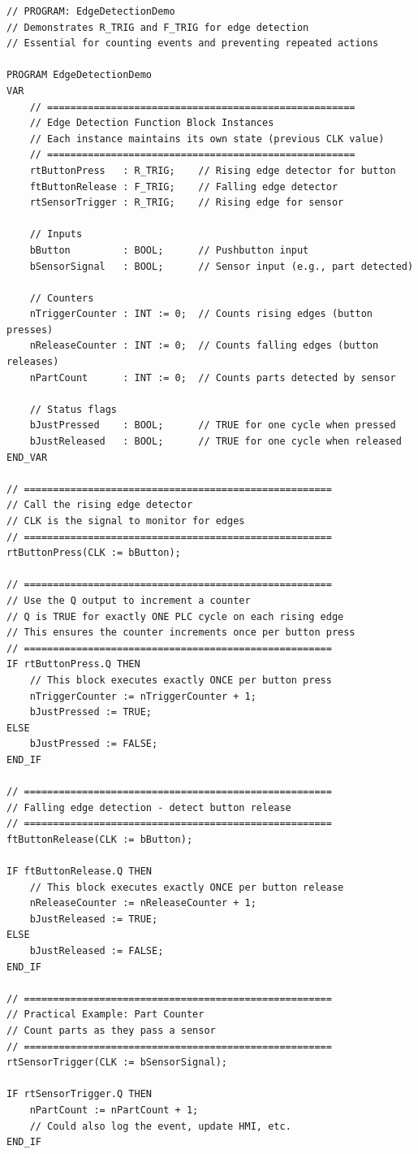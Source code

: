 \documentclass[11pt,a4paper]{article}
\begin{document}
\begin{lstlisting}
// PROGRAM: EdgeDetectionDemo
// Demonstrates R_TRIG and F_TRIG for edge detection
// Essential for counting events and preventing repeated actions

PROGRAM EdgeDetectionDemo
VAR
    // =====================================================
    // Edge Detection Function Block Instances
    // Each instance maintains its own state (previous CLK value)
    // =====================================================
    rtButtonPress   : R_TRIG;    // Rising edge detector for button
    ftButtonRelease : F_TRIG;    // Falling edge detector
    rtSensorTrigger : R_TRIG;    // Rising edge for sensor
    
    // Inputs
    bButton         : BOOL;      // Pushbutton input
    bSensorSignal   : BOOL;      // Sensor input (e.g., part detected)
    
    // Counters
    nTriggerCounter : INT := 0;  // Counts rising edges (button presses)
    nReleaseCounter : INT := 0;  // Counts falling edges (button releases)
    nPartCount      : INT := 0;  // Counts parts detected by sensor
    
    // Status flags
    bJustPressed    : BOOL;      // TRUE for one cycle when pressed
    bJustReleased   : BOOL;      // TRUE for one cycle when released
END_VAR

// =====================================================
// Call the rising edge detector
// CLK is the signal to monitor for edges
// =====================================================
rtButtonPress(CLK := bButton);

// =====================================================
// Use the Q output to increment a counter
// Q is TRUE for exactly ONE PLC cycle on each rising edge
// This ensures the counter increments once per button press
// =====================================================
IF rtButtonPress.Q THEN
    // This block executes exactly ONCE per button press
    nTriggerCounter := nTriggerCounter + 1;
    bJustPressed := TRUE;
ELSE
    bJustPressed := FALSE;
END_IF

// =====================================================
// Falling edge detection - detect button release
// =====================================================
ftButtonRelease(CLK := bButton);

IF ftButtonRelease.Q THEN
    // This block executes exactly ONCE per button release
    nReleaseCounter := nReleaseCounter + 1;
    bJustReleased := TRUE;
ELSE
    bJustReleased := FALSE;
END_IF

// =====================================================
// Practical Example: Part Counter
// Count parts as they pass a sensor
// =====================================================
rtSensorTrigger(CLK := bSensorSignal);

IF rtSensorTrigger.Q THEN
    nPartCount := nPartCount + 1;
    // Could also log the event, update HMI, etc.
END_IF
\end{lstlisting}
\end{document}
